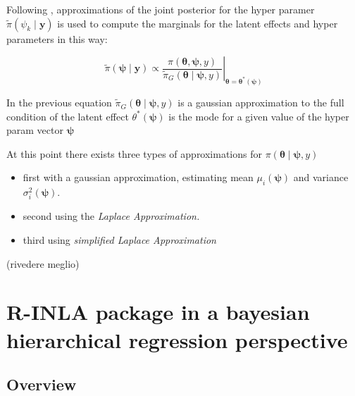 \documentclass[
  12pt,
  a4paper,
  oneside]{book}
\providecommand{\tightlist}{%
  \setlength{\itemsep}{0pt}\setlength{\parskip}{0pt}}
\theoremstyle{definition}
\theoremstyle{definition}
\theoremstyle{definition}
\theoremstyle{remark}
\begin{document}
Following \citet{Bayesian_INLA_Rubio}, approximations of the joint posterior for the hyper paramer \(\tilde\pi\left(\psi_{k} \mid \boldsymbol{y}\right)\) is used to compute the marginals for the latent effects and hyper parameters in this way:

\[
\left.\tilde{\pi}(\boldsymbol{\psi} \mid \mathbf{y}) \propto \frac{\pi(\boldsymbol{\theta}, \boldsymbol{\psi}, y)}{\tilde{\pi}_{G}(\boldsymbol{\theta} \mid \boldsymbol{\psi}, y)}\right|_{\boldsymbol{\theta}=\boldsymbol{\theta}^{*}(\boldsymbol{\psi})}
\]

In the previous equation \(\tilde{\pi}_{G}(\boldsymbol{\theta} \mid \boldsymbol{\psi}, y)\) is a gaussian approximation to the full condition of the latent effect \({\theta}^{*}(\boldsymbol{\psi})\) is the mode for a given value of the hyper param vector \(\boldsymbol{\psi}\)

At this point there exists three types of approximations for \(\pi\left(\boldsymbol{\theta} \mid \boldsymbol{\psi}, y\right)\)

\begin{itemize}
\tightlist
\item
  first with a gaussian approximation, estimating mean \(\mu_{i}(\boldsymbol{\psi})\) and variance \(\sigma_{i}^{2}(\boldsymbol{\psi})\).
\item
  second using the \emph{Laplace Approximation.}
\item
  third using \emph{simplified Laplace Approximation}
\end{itemize}

(rivedere meglio)

\hypertarget{rinla}{%
\section{R-INLA package in a bayesian hierarchical regression perspective}\label{rinla}}

\hypertarget{overview}{%
\subsection{Overview}\label{overview}}
\end{document}
